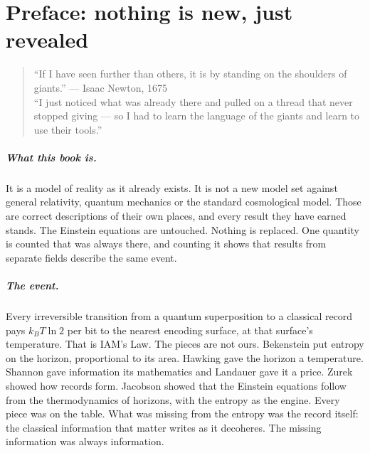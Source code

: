 \chapter*{Preface: nothing is new, just revealed}

\begin{quote}``If I have seen further than others, it is by standing on the shoulders of giants.'' --- Isaac Newton, 1675\\[2pt]
``I just noticed what was already there and pulled on a thread that never stopped giving --- so I had to learn the language of the giants and
learn to use their tools.''\end{quote}

\paragraph{What this book is.} It is a model of reality as it already exists. It is not a new model set against general relativity, quantum
mechanics or the standard cosmological model. Those are correct descriptions of their own places, and every result they have earned stands. The
Einstein equations are untouched. Nothing is replaced. One quantity is counted that was always there, and counting it shows that results from
separate fields describe the same event.

\paragraph{The event.} Every irreversible transition from a quantum superposition to a classical record pays $k_BT\ln2$ per bit to the nearest
encoding surface, at that surface's temperature. That is IAM's Law. The pieces are not ours. Bekenstein put entropy on the horizon, proportional
to its area. Hawking gave the horizon a temperature. Shannon gave information its mathematics and Landauer gave it a price. Zurek showed how
records form. Jacobson showed that the Einstein equations follow from the thermodynamics of horizons, with the entropy as the engine. Every piece
was on the table. What was missing from the entropy was the record itself: the classical information that matter writes as it decoheres. The
missing information was always information.

